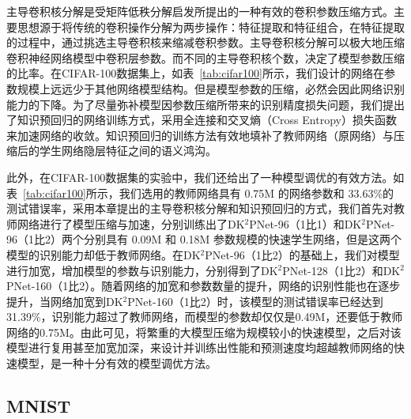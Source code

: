 主导卷积核分解是受矩阵低秩分解启发所提出的一种有效的卷积参数压缩方式。主要思想源于将传统的卷积操作分解为两步操作：特征提取和特征组合，在特征提取的过程中，通过挑选主导卷积核来缩减卷积参数。主导卷积核分解可以极大地压缩卷积神经网络模型中卷积层参数。而不同的主导卷积核个数，决定了模型参数压缩的比率。在CIFAR-100数据集上，如表~\ref{tab:cifar100}所示，我们设计的网络在参数规模上远远少于其他网络模型结构。但是模型参数的压缩，必然会因此网络识别能力的下降。为了尽量弥补模型因参数压缩所带来的识别精度损失问题，我们提出了知识预回归的网络训练方式，采用全连接和交叉熵（Cross Entropy）损失函数来加速网络的收敛。知识预回归的训练方法有效地填补了教师网络（原网络）与压缩后的学生网络隐层特征之间的语义鸿沟。

此外，在CIFAR-100数据集的实验中，我们还给出了一种模型调优的有效方法。如表~\ref{tab:cifar100}所示，我们选用的教师网络具有 0.75M 的网络参数和 33.63\%的测试错误率，采用本章提出的主导卷积核分解和知识预回归的方式，我们首先对教师网络进行了模型压缩与加速，分别训练出了DK$^2$PNet-96（1比1）和DK$^2$PNet-96（1比2）两个分别具有 0.09M 和 0.18M 参数规模的快速学生网络，但是这两个模型的识别能力却低于教师网络。在DK$^2$PNet-96（1比2）的基础上，我们对模型进行加宽，增加模型的参数与识别能力，分别得到了DK$^2$PNet-128（1比2）和DK$^2$PNet-160（1比2）。随着网络的加宽和参数数量的提升，网络的识别性能也在逐步提升，当网络加宽到DK$^2$PNet-160（1比2）时，该模型的测试错误率已经达到31.39\%，识别能力超过了教师网络，而模型的参数却仅仅是0.49M，还要低于教师网络的0.75M。由此可见，将繁重的大模型压缩为规模较小的快速模型，之后对该模型进行复用甚至加宽加深，来设计并训练出性能和预测速度均超越教师网络的快速模型，是一种十分有效的模型调优方法。


\subsection{MNIST}
\label{sec:acc:experiment:mnist}

